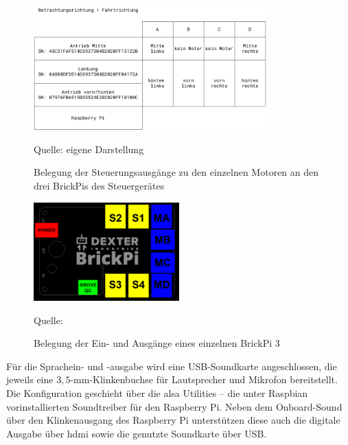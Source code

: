 \begin{figure}
	\centering
	\includegraphics[width=0.8\textwidth]{../Images/brickpiconfig.pdf}
	\vspace{0.5em}
	\parbox[c]{0.8\linewidth}{\footnotesize
		\centering
		\vspace{1em}
		Quelle: eigene Darstellung
	}
	\caption{Belegung der Steuerungsausgänge zu den einzelnen Motoren an den drei BrickPis des Steuergerätes}
	\label{fig:brickpistack}
\end{figure}

\begin{figure}
	\centering
	\includegraphics[width=0.5\textwidth]{../Images/BrickPi3-Port-Layout.png}
	\vspace{0.5em}
	\parbox[c]{0.8\linewidth}{\footnotesize
		\centering
		\vspace{1em}
		Quelle: \cite{dexter2017}
	}
	\caption{Belegung der Ein- und Ausgänge eines einzelnen BrickPi 3}
	\label{fig:brickpi3ports}
\end{figure}

Für die Sprachein- und -ausgabe wird eine USB-Soundkarte angeschlossen, die jeweils eine $3{,}5$-mm-Klinkenbuchse für Lautsprecher und Mikrofon bereitstellt.
Die Konfiguration geschieht über die \acf{alsa} Utilities -- die unter Raspbian vorinstallierten Soundtreiber für den Raspberry Pi.
Neben dem Onboard-Sound über den Klinkenausgang des Raspberry Pi unterstützen diese auch die digitale Ausgabe über \acf{hdmi} sowie die genutzte Soundkarte über USB. \cite{molloy2016}

